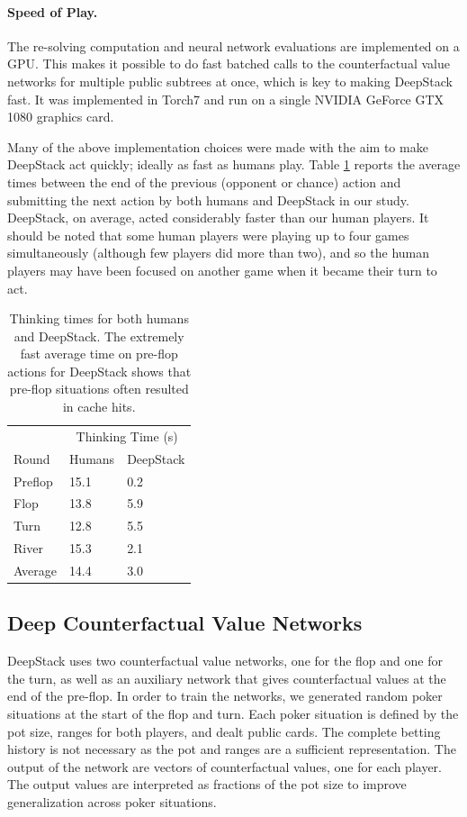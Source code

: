 \paragraph{Speed of Play.} 
The re-solving computation and neural network evaluations are implemented on a GPU.  This makes it possible to do fast batched calls to the counterfactual value networks for multiple public subtrees at once, which is key to making DeepStack fast.  It was implemented in Torch7 \cite{collobert2011torch7} and run on a single NVIDIA GeForce GTX 1080 graphics card.

Many of the above implementation choices were made with the aim to make DeepStack act quickly; ideally as fast as humans play.  
Table \ref{tab-times} reports the average times between the end of the previous (opponent or chance) action and submitting the next action by both humans and DeepStack in our study.  DeepStack, on average, acted considerably faster than our human players.  It should be noted that some human players were playing up to four games simultaneously (although few players did more than two), and so the human players may have been focused on another game when it became their turn to act.

\begin{table}[h!]
\centering
\caption{Thinking times for both humans and DeepStack.
The extremely fast average time on pre-flop actions for DeepStack shows that pre-flop situations often resulted in cache hits.}
\label{tab-times}
\begin{tabular}{l|ll}
\toprule
           & \multicolumn{2}{c}{Thinking Time (s)} \\ 
Round & Humans & DeepStack \\
\midrule
Preflop & 15.1  & 0.2 \\
Flop &  13.8 & 5.9 \\
Turn & 12.8 & 5.5 \\
River & 15.3& 2.1 \\
\midrule
Average & 14.4 & 3.0 \\
 \bottomrule
\end{tabular}
\end{table}

\subsection*{Deep Counterfactual Value Networks}

DeepStack uses two counterfactual value networks, one for the flop and one for the turn, as well as an auxiliary network that gives counterfactual values at the end of the pre-flop.  In order to train the networks, we generated random poker situations at the start of the flop and turn.  Each poker situation is defined by the pot size, ranges for both players, and dealt public cards.  The complete betting history is not necessary as the pot and ranges are a sufficient representation.  The output of the network are vectors of counterfactual values, one for each player.  The output values are interpreted as fractions of the pot size to improve generalization across poker situations. 

